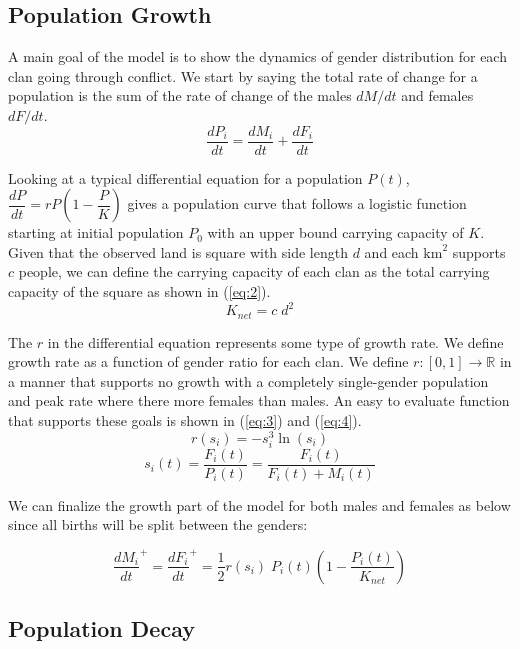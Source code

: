 \documentclass[letterpaper, 9pt, conference]{ieeeconf}  %
\begin{document}
\subsection{Population Growth}
A main goal of the model is to show the dynamics of gender distribution for each clan going through conflict. We start by saying the total rate of change for a population is the sum of the rate of change of the males $dM/dt$ and females $dF/dt$.
\begin{equation}
\frac{dP_i}{dt} = \frac{dM_i}{dt} + \frac{dF_i}{dt} \label{eq:1}
\end{equation}

Looking at a typical differential equation for a population $P(t)$, $\dfrac{dP}{dt} = rP\left(1 - \dfrac{P}{K}\right)$ gives a population curve that follows a logistic function starting at initial population $P_0$ with an upper bound carrying capacity of $K$. Given that the observed land is square with side length $d$ and each $\text{km}^2$ supports $c$ people, we can define the carrying capacity of each clan as the total carrying capacity of the square as shown in (\ref{eq:2}).
\begin{equation}
    K_{net} = c\;d^2 \label{eq:2}
\end{equation}

The $r$ in the differential equation represents some type of growth rate. We define growth rate as a function of gender ratio for each clan. 
We define $ r: [0, 1] \to \mathbb{R} $ in a manner that supports no growth with a completely single-gender population and peak rate where there more females than males. An easy to evaluate function that supports these goals is shown in (\ref{eq:3}) and (\ref{eq:4}).
\begin{equation}
    r(s_i) = -s_i^3 \ln{(s_i)} \label{eq:3}
\end{equation}
\begin{equation}
    s_i(t) = \frac{F_i(t)}{P_i (t)} = \frac{F_i(t)}{F_i(t)+M_i(t)} \label{eq:4}
\end{equation}

We can finalize the growth part of the model for both males and females as below since all births will be split between the genders:

\begin{equation}
    \frac{dM_i}{dt}^{+} = \frac{dF_i}{dt}^{+} = \frac{1}{2}r(s_i)\;P_i(t)\left(1 - \frac{P_i(t)}{K_{net}}\right) \label{eq:5}
\end{equation}

\subsection{Population Decay}
\end{document}
